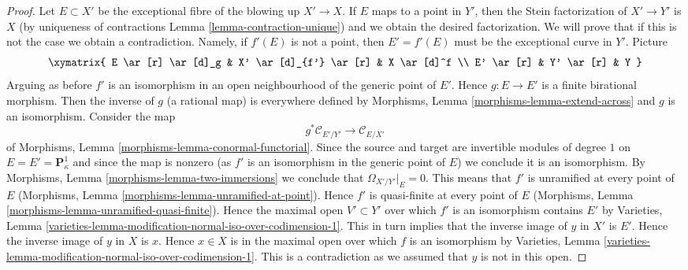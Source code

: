 \begin{proof}
\medskip\noindent
Let $E \subset X'$ be the exceptional fibre of the blowing up
$X' \to X$. If $E$ maps to a point in $Y'$, then the
Stein factorization of $X' \to Y'$ is $X$ (by uniqueness
of contractions Lemma \ref{lemma-contraction-unique})
and we obtain the desired factorization. We will prove that
if this is not the case we obtain a contradiction. Namely,
if $f'(E)$ is not a point, then
$E' = f'(E)$ must be the exceptional curve in $Y'$.
Picture
$$
\xymatrix{
E \ar[r] \ar[d]_g & X' \ar[d]_{f'} \ar[r] & X \ar[d]^f \\
E' \ar[r] & Y' \ar[r] & Y
}
$$
Arguing as before $f'$ is an isomorphism in an open neighbourhood
of the generic point of $E'$. Hence $g : E \to E'$ is a finite birational
morphism. Then the inverse of $g$ (a rational map) is everywhere defined
by Morphisms, Lemma \ref{morphisms-lemma-extend-across} and $g$ is
an isomorphism. Consider the map
$$
g^*\mathcal{C}_{E'/Y'} \longrightarrow \mathcal{C}_{E/X'}
$$
of Morphisms, Lemma \ref{morphisms-lemma-conormal-functorial}.
Since the source and target are invertible modules of degree $1$
on $E = E' = \mathbf{P}^1_\kappa$ and since the map is
nonzero (as $f'$ is an isomorphism in the generic point of $E$)
we conclude it is an isomorphism. By
Morphisms, Lemma \ref{morphisms-lemma-two-immersions}
we conclude that $\Omega_{X'/Y'}|_E = 0$.
This means that $f'$ is unramified at every point of $E$
(Morphisms, Lemma \ref{morphisms-lemma-unramified-at-point}).
Hence $f'$ is quasi-finite at every point of $E$
(Morphisms, Lemma \ref{morphisms-lemma-unramified-quasi-finite}).
Hence the maximal open $V' \subset Y'$ over which $f'$ is an
isomorphism contains $E'$ by Varieties, Lemma
\ref{varieties-lemma-modification-normal-iso-over-codimension-1}.
This in turn implies that the inverse image of $y$ in
$X'$ is $E'$. Hence the inverse image of $y$ in $X$ is $x$.
Hence $x \in X$ is in the maximal open over which
$f$ is an isomorphism by Varieties, Lemma
\ref{varieties-lemma-modification-normal-iso-over-codimension-1}.
This is a contradiction as we assumed that $y$ is not
in this open.
\end{proof}













